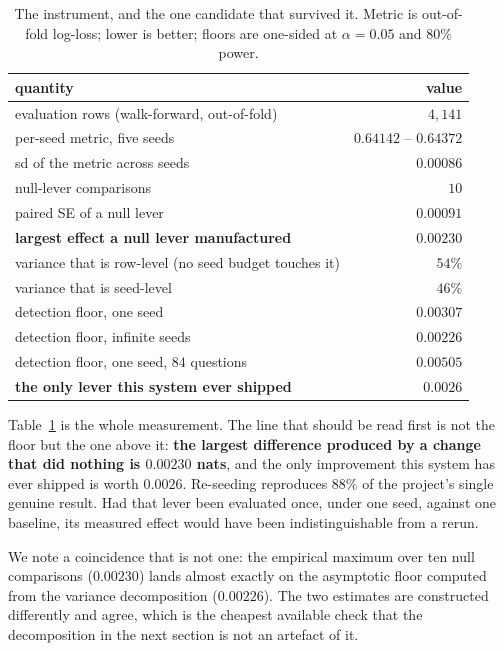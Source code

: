 \documentclass{article}
\begin{document}
\begin{table}[t]
\centering\small
\begin{tabular}{lr}
\toprule
quantity & value \\
\midrule
evaluation rows (walk-forward, out-of-fold) & $4{,}141$ \\
per-seed metric, five seeds & $0.64142$ -- $0.64372$ \\
sd of the metric across seeds & $0.00086$ \\
\midrule
null-lever comparisons & $10$ \\
paired SE of a null lever & $0.00091$ \\
\textbf{largest effect a null lever manufactured} & $\mathbf{0.00230}$ \\
\midrule
variance that is row-level (no seed budget touches it) & $54\%$ \\
variance that is seed-level & $46\%$ \\
\midrule
detection floor, one seed & $0.00307$ \\
detection floor, infinite seeds & $0.00226$ \\
detection floor, one seed, $84$ questions & $0.00505$ \\
\midrule
\textbf{the only lever this system ever shipped} & $\mathbf{0.0026}$ \\
\bottomrule
\end{tabular}
\caption{The instrument, and the one candidate that survived it. Metric is out-of-fold log-loss; lower is better; floors are one-sided at $\alpha=0.05$ and $80\%$ power.}
\label{tab:floor}
\end{table}

Table~\ref{tab:floor} is the whole measurement. The line that should be read first is not the floor but the one above it: \textbf{the largest difference produced by a change that did nothing is $0.00230$ nats}, and the only improvement this system has ever shipped is worth $0.0026$. Re-seeding reproduces $88\%$ of the project's single genuine result. Had that lever been evaluated once, under one seed, against one baseline, its measured effect would have been indistinguishable from a rerun.

We note a coincidence that is not one: the empirical maximum over ten null comparisons ($0.00230$) lands almost exactly on the asymptotic floor computed from the variance decomposition ($0.00226$). The two estimates are constructed differently and agree, which is the cheapest available check that the decomposition in the next section is not an artefact of it.
\end{document}
